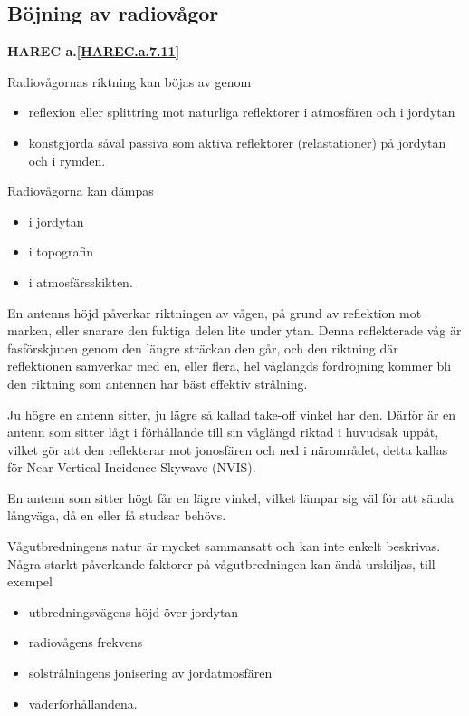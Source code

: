 \subsection{Böjning av radiovågor}
\textbf{HAREC a.\ref{HAREC.a.7.11}\label{myHAREC.a.7.11}}

Radiovågornas riktning kan böjas av genom
\begin{itemize}
  \item reflexion eller splittring mot naturliga reflektorer i
  atmosfären och i jordytan
  \item konstgjorda såväl passiva som aktiva reflektorer (relästationer)
  på jordytan och i rymden.
\end{itemize}

Radiovågorna kan dämpas
\begin{itemize}
  \item i jordytan
  \item i topografin
  \item i atmosfärsskikten.
\end{itemize}

En antenns höjd påverkar riktningen av vågen, på grund av reflektion mot
marken, eller snarare den fuktiga delen lite under ytan.
Denna reflekterade våg är fasförskjuten genom den längre sträckan den går,
och den riktning där reflektionen samverkar med en, eller flera, hel våglängds
fördröjning kommer bli den riktning som antennen har bäst effektiv strålning.

Ju högre en antenn sitter, ju lägre så kallad take-off vinkel har den.
Därför är en antenn som sitter lågt i förhållande till sin våglängd riktad i
huvudsak uppåt, vilket gör att den reflekterar mot jonosfären och ned i
närområdet, detta kallas för Near Vertical Incidence Skywave (NVIS). 

En antenn som sitter högt får en lägre vinkel, vilket lämpar sig väl för att
sända långväga, då en eller få studsar behövs.

Vågutbredningens natur är mycket sammansatt och kan inte enkelt beskrivas.
Några starkt påverkande faktorer på vågutbredningen kan ändå urskiljas, till exempel
\begin{itemize}
  \item utbredningsvägens höjd över jordytan
  \item radiovågens frekvens
  \item solstrålningens jonisering av jordatmosfären
  \item väderförhållandena.
\end{itemize}

